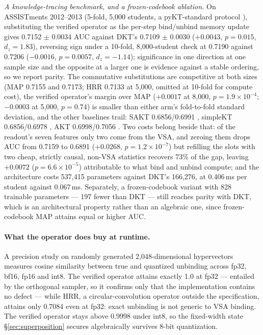 \documentclass[10pt]{article}
\begin{document}
\emph{A knowledge-tracing benchmark, and a frozen-codebook ablation.} On ASSISTments 2012--2013 (5-fold, 5{,}000 students, a pyKT-standard protocol \citep{liu2022pykt}), substituting the verified operator as the per-step bind/unbind memory update gives 0.7152 $\pm$ 0.0034 AUC against DKT's 0.7109 $\pm$ 0.0030 \citep{piech2015deep} ($+0.0043$, $p = 0.015$, $d_z = 1.83$), reversing sign under a 10-fold, 8{,}000-student check at 0.7190 against 0.7206 ($-0.0016$, $p = 0.0057$, $d_z = -1.14$); significance in one direction at one sample size and the opposite at a larger one is evidence against a stable ordering, so we report parity. The commutative substitutions are competitive at both sizes (MAP 0.7155 and 0.7173; HRR 0.7133 at 5{,}000, omitted at 10-fold for compute cost), the verified operator's margin over MAP ($+0.0017$ at 8{,}000, $p = 1.9\times10^{-4}$; $-0.0003$ at 5{,}000, $p = 0.74$) is smaller than either arm's fold-to-fold standard deviation, and the other baselines trail: SAKT 0.6856/0.6991 \citep{pandey2019sakt}, simpleKT 0.6856/0.6978 \citep{liu2023simplekt}, AKT 0.6998/0.7056 \citep{ghosh2020akt}. Two costs belong beside that: of the readout's seven features only two come from the VSA, and zeroing them drops AUC from 0.7159 to 0.6891 ($+0.0268$, $p = 1.2\times10^{-7}$) but refilling the slots with two cheap, strictly causal, non-VSA statistics recovers 73\% of the gap, leaving $+0.0072$ ($p = 6.6\times10^{-5}$) attributable to what bind and unbind compute; and the architecture costs 537{,}415 parameters against DKT's 166{,}276, at 0.406\,ms per student against 0.067\,ms. Separately, a frozen-codebook variant with 828 trainable parameters --- 197 fewer than DKT --- still reaches parity with DKT, which is an architectural property rather than an algebraic one, since frozen-codebook MAP attains equal or higher AUC.

\paragraph{What the operator does buy at runtime.} A precision study on randomly generated 2{,}048-dimensional hypervectors measures cosine similarity between true and quantized unbinding across fp32, bf16, fp16 and int8. The verified operator attains exactly 1.0 at fp32 --- entailed by the orthogonal sampler, so it confirms only that the implementation contains no defect --- while HRR, a circular-convolution operator outside the specification, attains only 0.7084 even at fp32: exact unbinding is not generic to VSA binding. The verified operator stays above 0.9998 under int8, so the fixed-width state \S\ref{sec:superposition} secures algebraically survives 8-bit quantization.
\end{document}
